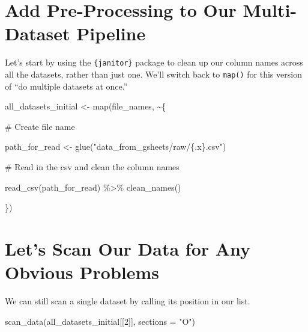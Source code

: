 \documentclass[
  letterpaper,
  DIV=11,
  numbers=noendperiod]{scrreprt}
\newenvironment{Shaded}{\begin{snugshade}}{\end{snugshade}}
\newcommand{\AttributeTok}[1]{\textcolor[rgb]{0.40,0.45,0.13}{#1}}
\newcommand{\CommentTok}[1]{\textcolor[rgb]{0.37,0.37,0.37}{#1}}
\newcommand{\DecValTok}[1]{\textcolor[rgb]{0.68,0.00,0.00}{#1}}
\newcommand{\FunctionTok}[1]{\textcolor[rgb]{0.28,0.35,0.67}{#1}}
\newcommand{\NormalTok}[1]{\textcolor[rgb]{0.00,0.23,0.31}{#1}}
\newcommand{\OtherTok}[1]{\textcolor[rgb]{0.00,0.23,0.31}{#1}}
\newcommand{\SpecialCharTok}[1]{\textcolor[rgb]{0.37,0.37,0.37}{#1}}
\newcommand{\StringTok}[1]{\textcolor[rgb]{0.13,0.47,0.30}{#1}}
\begin{document}
\hypertarget{add-pre-processing-to-our-multi-dataset-pipeline}{%
\section{Add Pre-Processing to Our Multi-Dataset
Pipeline}\label{add-pre-processing-to-our-multi-dataset-pipeline}}

Let's start by using the \texttt{\{janitor\}} package to clean up our
column names across all the datasets, rather than just one. We'll switch
back to \texttt{map()} for this version of ``do multiple datasets at
once.''

\begin{Shaded}
\begin{Highlighting}[]
\NormalTok{all\_datasets\_initial }\OtherTok{\textless{}{-}} \FunctionTok{map}\NormalTok{(file\_names, }\SpecialCharTok{\textasciitilde{}}\NormalTok{\{}
  
  \CommentTok{\# Create file name}
  
\NormalTok{  path\_for\_read }\OtherTok{\textless{}{-}} \FunctionTok{glue}\NormalTok{(}\StringTok{"data\_from\_gsheets/raw/\{.x\}.csv"}\NormalTok{)}
  
  \CommentTok{\# Read in the csv and clean the column names}
  
  \FunctionTok{read\_csv}\NormalTok{(path\_for\_read) }\SpecialCharTok{\%\textgreater{}\%}
    \FunctionTok{clean\_names}\NormalTok{()}
  
\NormalTok{\})}
\end{Highlighting}
\end{Shaded}

\hypertarget{lets-scan-our-data-for-any-obvious-problems}{%
\section{Let's Scan Our Data for Any Obvious
Problems}\label{lets-scan-our-data-for-any-obvious-problems}}

We can still scan a single dataset by calling its position in our list.

\begin{Shaded}
\begin{Highlighting}[]
\FunctionTok{scan\_data}\NormalTok{(all\_datasets\_initial[[}\DecValTok{2}\NormalTok{]], }\AttributeTok{sections =} \StringTok{"O"}\NormalTok{)}
\end{Highlighting}
\end{Shaded}
\end{document}
